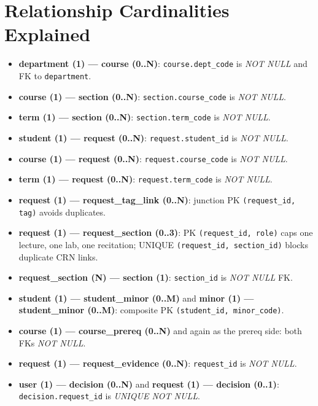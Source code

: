 \documentclass[11pt]{article}
\newcommand{\code}[1]{\texttt{#1}}
\begin{document}
\section*{Relationship Cardinalities Explained}
\begin{itemize}
  \item \textbf{department (1) — course (0..N)}: \code{course.dept\_code} is \emph{NOT NULL} and FK to \code{department}.
  \item \textbf{course (1) — section (0..N)}: \code{section.course\_code} is \emph{NOT NULL}.
  \item \textbf{term (1) — section (0..N)}: \code{section.term\_code} is \emph{NOT NULL}.
  \item \textbf{student (1) — request (0..N)}: \code{request.student\_id} is \emph{NOT NULL}.
  \item \textbf{course (1) — request (0..N)}: \code{request.course\_code} is \emph{NOT NULL}.
  \item \textbf{term (1) — request (0..N)}: \code{request.term\_code} is \emph{NOT NULL}.
  \item \textbf{request (1) — request\_tag\_link (0..N)}: junction PK \code{(request\_id, tag)} avoids duplicates.
  \item \textbf{request (1) — request\_section (0..3)}: PK \code{(request\_id, role)} caps one lecture, one lab, one recitation; UNIQUE \code{(request\_id, section\_id)} blocks duplicate CRN links.
  \item \textbf{request\_section (N) — section (1)}: \code{section\_id} is \emph{NOT NULL} FK.
  \item \textbf{student (1) — student\_minor (0..M)} and \textbf{minor (1) — student\_minor (0..M)}: composite PK \code{(student\_id, minor\_code)}.
  \item \textbf{course (1) — course\_prereq (0..N)} and again as the prereq side: both FKs \emph{NOT NULL}.
  \item \textbf{request (1) — request\_evidence (0..N)}: \code{request\_id} is \emph{NOT NULL}.
  \item \textbf{user (1) — decision (0..N)} and \textbf{request (1) — decision (0..1)}: \code{decision.request\_id} is \emph{UNIQUE NOT NULL}.
\end{itemize}

\end{document}

